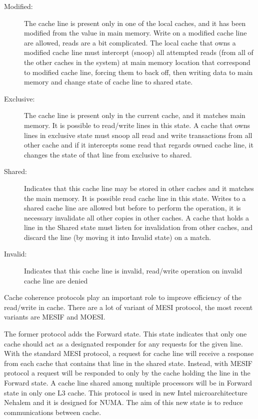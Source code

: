 \begin{description}

\item [Modified:]
The cache line is present only in one of the local caches, and it has been modified from the value in main memory. Write on a modified cache line are 
allowed, reads are a bit complicated. The local cache that owns a modified cache line must intercept (snoop) all attempted reads (from all of the other 
caches in the system) at main memory location that correspond to modified cache line, forcing them to back off, then writing data to main memory and change
state of cache line to shared state.
 
\item [Exclusive:]
The cache line is present only in the current cache, and it matches main memory. It is possible to read/write lines in this state. A cache that owns
lines in exclusive state must snoop all read and write transactions from all other cache and if it intercepts some read that regards owned cache line, 
it changes the state of that line from exclusive to shared. 

\item [Shared:]
Indicates that this cache line may be stored in other caches and it matches the main memory. It is possible read cache line in this state. Writes to a 
shared cache line are allowed but before to perform the operation, it is necessary invalidate all other copies in other caches.
A cache that holds a line in the Shared state must listen for invalidation from other caches, and discard the line (by moving it into Invalid state) on a 
match.

\item [Invalid:]
Indicates that this cache line is invalid, read/write operation on invalid cache line are denied

\end{description}

Cache coherence protocols play an important role to improve efficiency of the read/write in cache. There are a lot of variant of MESI protocol, the most 
recent variants are MESIF and MOESI.

The former protocol adds the Forward state. This state indicates that only one cache should act as a designated 
responder for any requests for the given line. With the standard MESI protocol, a request for cache line will receive a response from each cache that 
contains that line in the shared state. Instead, with MESIF protocol a request will be responded to only by the cache holding the line in the Forward state.
A cache line shared among multiple processors will be in Forward state in only one L3 cache. This protocol is used in new Intel microarchitecture Nehalem 
and it is designed for NUMA. The aim of this new state is to reduce communications between cache.


